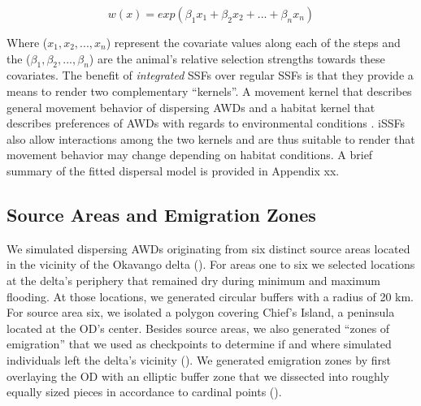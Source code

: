 \documentclass[abstract=on,10pt,a4paper,bibliography=totocnumbered]{article}
\begin{document}
\begin{equation}
\label{EQ1}
  w(x) = exp(\beta_1 x_1 + \beta_2 x_2 + ... + \beta_n x_n)
\end{equation}

Where (\(x_1, x_2, ..., x_n\)) represent the covariate values along each of the
steps and the (\(\beta_1, \beta_2, ..., \beta_n\)) are the animal's relative
selection strengths \citealp{Avgar.2017} towards these covariates. The benefit
of \textit{integrated} SSFs over regular SSFs is that they provide a means to
render two complementary ``kernels''. A movement kernel that describes general
movement behavior of dispersing AWDs and a habitat kernel that describes
preferences of AWDs with regards to environmental conditions
\citep{Fieberg.2021}. iSSFs also allow interactions among the two kernels and
are thus suitable to render that movement behavior may change depending on
habitat conditions. A brief summary of the fitted dispersal model is provided in
Appendix xx.

\subsection{Source Areas and Emigration Zones}
We simulated dispersing AWDs originating from six distinct source areas located
in the vicinity of the Okavango delta (). For areas one to six
we selected locations at the delta's periphery that remained dry during minimum
and maximum flooding. At those locations, we generated circular buffers with a
radius of 20 km. For source area six, we isolated a polygon covering Chief's
Island, a peninsula located at the OD's center. Besides source areas, we also
generated ``zones of emigration'' that we used as checkpoints to determine if
and where simulated individuals left the delta's vicinity (). We
generated emigration zones by first overlaying the OD with an elliptic buffer
zone that we dissected into roughly equally sized pieces in accordance to
cardinal points ().
\end{document}
